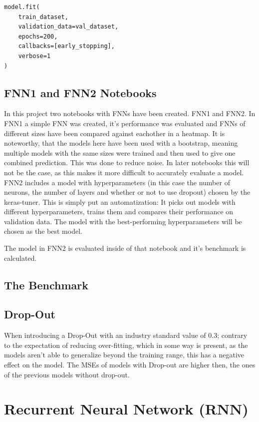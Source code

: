 \documentclass{article}
\begin{document}
\begin{Verbatim}
model.fit(
    train_dataset,
    validation_data=val_dataset,
    epochs=200,
    callbacks=[early_stopping],
    verbose=1
)
\end{Verbatim}

\subsection{FNN1 and FNN2 Notebooks}
In this project two notebooks with FNNs have been created. FNN1 and FNN2. 
In FNN1 a simple FNN was created, it's performance was evaluated and FNNs 
of different sizes have been compared against eachother in a heatmap. It is 
noteworthy, that the models here have been used with a bootstrap, meaning 
multiple models with the same sizes were trained and then used to give one 
combined prediction. This was done to reduce noise. In later notebooks this 
will not be the case, as this makes it more difficult to accurately evaluate 
a model.
\\[2em]
FNN2 includes a model with hyperparameters (in this case the number of 
neurons, the number of layers and whether or not to use dropout) chosen by 
the keras-tuner. This is simply put an automatization: It picks out models 
with different hyperparameters, trains them and compares their performance 
on validation data. The model with the best-performing hyperparameters will 
be chosen as the best model.

The model in FNN2 is evaluated inside of that notebook and it's benchmark 
is calculated.

\subsection{The Benchmark}


\subsection{Drop-Out}
When introducing a Drop-Out with an industry standard value of 0.3; contrary 
to the expectation of reducing over-fitting, which in some way is present, 
as the models aren't able to generalize beyond the training range, this has 
a negative effect on the model. The MSEs of models with Drop-out are higher 
then, the ones of the previous models without drop-out.

\section{Recurrent Neural Network (RNN)}
\end{document}
